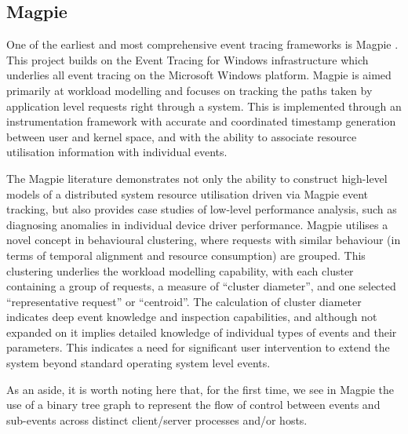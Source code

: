 \subsection{Magpie}

One of the earliest and most comprehensive event tracing frameworks is Magpie
\cite{magpie}.  This project builds on the Event Tracing for Windows
infrastructure which underlies all event tracing on the Microsoft Windows
platform. Magpie is aimed primarily at workload modelling and focuses on
tracking the paths taken by application level requests right through a system.
This is implemented through an instrumentation framework with accurate and
coordinated timestamp generation between user and kernel space, and with the
ability to associate resource utilisation information with individual events.

The Magpie literature demonstrates not only the ability to construct high-level
models of a distributed system resource utilisation driven via Magpie event
tracking, but also provides case studies of low-level performance analysis,
such as diagnosing anomalies in individual device driver performance. Magpie
utilises a novel concept in behavioural clustering, where requests with similar
behaviour (in terms of temporal alignment and resource consumption) are
grouped. This clustering underlies the workload modelling capability, with each
cluster containing a group of requests, a measure of “cluster diameter”, and
one selected “representative request” or “centroid”. The calculation of cluster
diameter indicates deep event knowledge and inspection capabilities, and
although not expanded on it implies detailed knowledge of individual types of
events and their parameters. This indicates a need for significant user
intervention to extend the system beyond standard operating system level
events.

As an aside, it is worth noting here that, for the first time, we see in Magpie
the use of a binary tree graph to represent the flow of control between events
and sub-events across distinct client/server processes and/or hosts.

